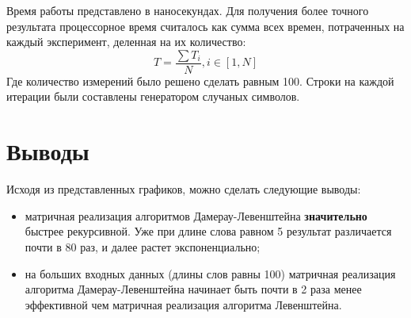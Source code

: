 \documentclass[12pt]{report}
\begin{document}
    Время работы представлено в наносекундах. Для получения более точного результата процессорное время считалось как сумма всех времен, потраченных на каждый эксперимент, деленная на их количество:
    \[
    	T = \frac{\sum T_i}{N}, i \in [1, N]
    \]
    Где количество измерений было решено сделать равным 100. Строки на каждой итерации были составлены генератором случаных символов.
    
    
    
    
    \par
    
     \section{Выводы}
     
    Исходя из представленных графиков, можно сделать следующие выводы:
    \begin{itemize}
    	\item матричная реализация алгоритмов Дамерау-Левенштейна {\bf значительно} быстрее рекурсивной. Уже при длине слова равном 5 результат различается почти в 80 раз, и далее растет экспоненциально;
    	\item  на больших входных данных (длины слов равны 100) матричная реализация алгоритма Дамерау-Левенштейна начинает быть почти в 2 раза менее эффективной чем матричная реализация алгоритма Левенштейна.
    \end{itemize}
    
\end{document}
